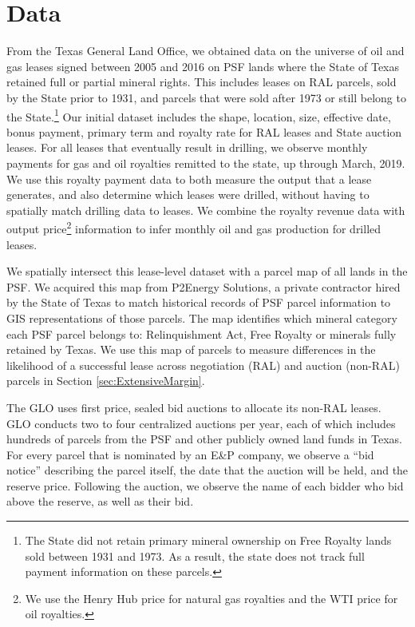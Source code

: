 \documentclass[12pt]{article}
\newcommand{\inputy}[1]{\unskip}
\begin{document}
\section{Data \label{sec:Data}}

From the Texas General Land Office, we obtained data on the universe of oil and gas leases signed between 2005 and 2016 on PSF lands where the State of Texas retained full or partial mineral rights. This includes leases on RAL parcels, sold by the State prior to 1931, and parcels that were sold after 1973 or still belong to the State.\footnote{The State did not retain primary mineral ownership on Free Royalty lands sold between 1931 and 1973. As a result, the state does not track full payment information on these parcels.} Our initial dataset includes the shape, location, size, effective date, bonus payment, primary term and royalty rate for \inputy{../output/estimates/Nsample_RAL_RAW.tex} RAL leases and \inputy{../output/estimates/Nsample_STATE_RAW.tex} State auction leases.  For all leases that eventually result in drilling, we observe monthly payments for gas and oil royalties remitted to the state, up through March, 2019. We use this royalty payment data to both measure the output that a lease generates, and also determine which leases were drilled,  without having to spatially match drilling data to leases. We combine the royalty revenue data with output price\footnote{We use the Henry Hub price for natural gas royalties and the WTI price for oil royalties.} information to infer monthly oil and gas production for drilled leases. 

We spatially intersect this lease-level dataset with a parcel map of all lands in the PSF.  We acquired this map from P2Energy Solutions, a private contractor hired by the State of Texas to match historical records of PSF parcel information to GIS representations of those parcels.  The map identifies which mineral category each PSF parcel belongs to: Relinquishment Act, Free Royalty or minerals fully retained by Texas.  We use this map of parcels to measure differences in the likelihood of a successful lease across negotiation (RAL) and auction (non-RAL) parcels in Section \ref{sec:ExtensiveMargin}. 

The GLO uses first price, sealed bid auctions to allocate its non-RAL leases. GLO conducts two to four centralized auctions per year, each of which includes hundreds of parcels from the PSF and other publicly owned land funds in Texas. For every parcel that is nominated by an E\&P company, we observe a ``bid notice'' describing the parcel itself, the date that the auction will be held, and the reserve price.  Following the auction, we observe the name of each bidder who bid above the reserve, as well as their bid.  
\end{document}
